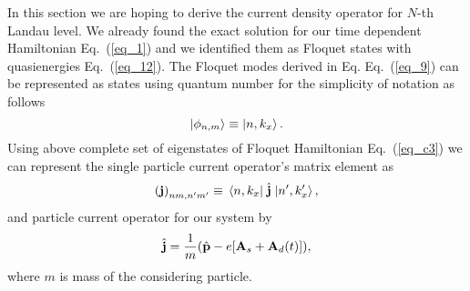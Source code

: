 In this section we are hoping to derive the current density operator for $N$-th Landau level. We already found the exact solution for our time dependent Hamiltonian Eq.~(\ref{eq_1}) and we identified them as Floquet states with quasienergies Eq.~(\ref{eq_12}). The Floquet modes derived in Eq. Eq.~(\ref{eq_9}) can be represented as states using quantum number for the simplicity of notation as follows
\begin{equation} \label{eq_d1}
  \ket{\phi_{n,m}} \equiv \ket{n,k_x}.
\end{equation}
Using above complete set of eigenstates of Floquet Hamiltonian Eq.~(\ref{eq_c3}) \cite{wackerl20,holthaus15,grifoni98} we can represent the single particle current operator's matrix element as
\begin{equation} \label{eq_d2}
  \qty(\vb{j})_{nm,n'm'} \equiv \mel{n,k_x}{\;\hat{\vb{j}}\;}{n',k'_x},
\end{equation}
and particle current operator for our system \cite{mahan00,bruus04} by
\begin{equation} \label{eq_d3}
  \hat{\vb{j}} = \frac{1}{m} \qty(\hat{\vb{p}} - e\qty[\vb{A}_s + \vb{A}_d(t)]),
\end{equation}
where $m$ is mass of the considering particle.

